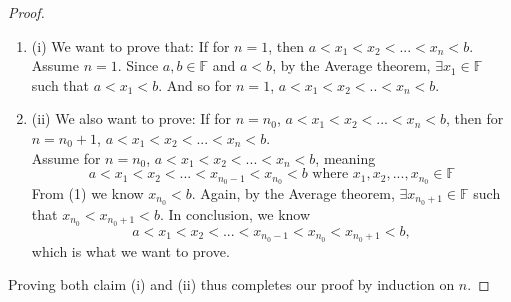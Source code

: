 \documentclass{article}
\theoremstyle{claim}
\theoremstyle{definition}
\begin{document}
\begin{enumerate}
\begin{proof}
            \begin{enumerate}
                \item[]{(i)} We want to prove that: If for $n = 1$, then $a < x_1 < x_2 < ... < x_n < b$.\\
                    Assume $n = 1$. Since $a, b \in \mathbb{F}$ and $a < b$, by the Average theorem, $\exists x_1 \in \mathbb{F}$ such that $a < x_1 < b$. And so for $n = 1$, $a < x_1 < x_2 < .. < x_n < b$.
                \item[]{(ii)} We also want to prove: If for $n = n_0$, $a < x_1 < x_2 < ... < x_n < b$, then for $n = n_0 + 1$, $a < x_1 < x_2 < ... < x_n < b$.\\
                    Assume for $n = n_0$, $a < x_1 < x_2 < ... < x_n < b$, meaning
                    \begin{equation}
                        a < x_1 < x_2 < ... < x_{n_0 - 1} < x_{n_0} < b \text{ where } x_1, x_2, ..., x_{n_0} \in \mathbb{F}
                    \end{equation}
                    From (1) we know $x_{n_0} < b$. Again, by the Average theorem, $\exists x_{n_0 + 1} \in \mathbb{F}$ such that $x_{n_0} < x_{n_0 + 1} < b$.
                    In conclusion, we know
                    \begin{equation*}
                        a < x_1 < x_2 < ... < x_{n_0 - 1} < x_{n_0} < x_{n_0 + 1} < b,
                    \end{equation*}
                    which is what we want to prove.\\
            \end{enumerate}
            Proving both claim (i) and (ii) thus completes our proof by induction on $n$.
        \end{proof}
\end{enumerate}
\end{document}
